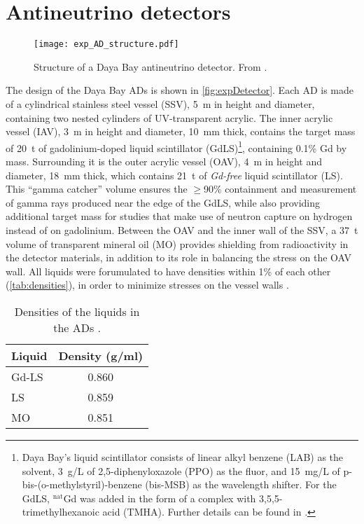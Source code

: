 \documentclass[../thesis.tex]{subfiles}
\begin{document}
\section{Antineutrino detectors}
\label{sec:expADs}

\begin{figure}[ht]
  \texttt{[image: exp\_AD\_structure.pdf]}
  \caption{Structure of a Daya Bay antineutrino detector. From \cite{An_2017}.}
  \label{fig:expDetector}
\end{figure}

The design of the Daya Bay ADs is shown in \autoref{fig:expDetector}. Each AD is made of a cylindrical stainless steel vessel (SSV), 5~m in height and diameter, containing two nested cylinders of UV-transparent acrylic. The inner acrylic vessel (IAV), 3~m in height and diameter, 10~mm thick, contains the target mass of 20~t of gadolinium-doped liquid scintillator (GdLS)\footnote{Daya Bay's liquid scintillator consists of linear alkyl benzene (LAB) as the solvent, 3~g/L of 2,5-diphenyloxazole (PPO) as the fluor, and 15~mg/L of p-bis-(o-methylstyril)-benzene (bis-MSB) as the wavelength shifter. For the GdLS, $^{\text{nat}}$Gd was added in the form of a complex with 3,5,5-trimethylhexanoic acid (TMHA). Further details can be found in \cite{Beriguete_2014}.}, containing 0.1\% Gd by mass. Surrounding it is the outer acrylic vessel (OAV), 4~m in height and diameter, 18~mm thick, which contains 21~t of \emph{Gd-free} liquid scintillator (LS). This ``gamma catcher'' volume ensures the $\ge$90\% containment and measurement of gamma rays produced near the edge of the GdLS, while also providing additional target mass for studies that make use of neutron capture on hydrogen instead of on gadolinium. Between the OAV and the inner wall of the SSV, a 37~t volume of transparent mineral oil (MO) provides shielding from radioactivity in the detector materials, in addition to its role in balancing the stress on the OAV wall. All liquids were forumulated to have densities within 1\% of each other (\autoref{tab:densities}), in order to minimize stresses on the vessel walls \cite{AN2016133}.

\begin{table}[ht]
  \begin{tabular}{lc}
    \toprule
    Liquid & Density (g/ml) \\
    \midrule
    Gd-LS & 0.860 \\
    LS & 0.859 \\
    MO & 0.851 \\
    \bottomrule
  \end{tabular}
  \caption{Densities of the liquids in the ADs \cite{SideBySide}.}
  \label{tab:densities}
\end{table}
\end{document}
